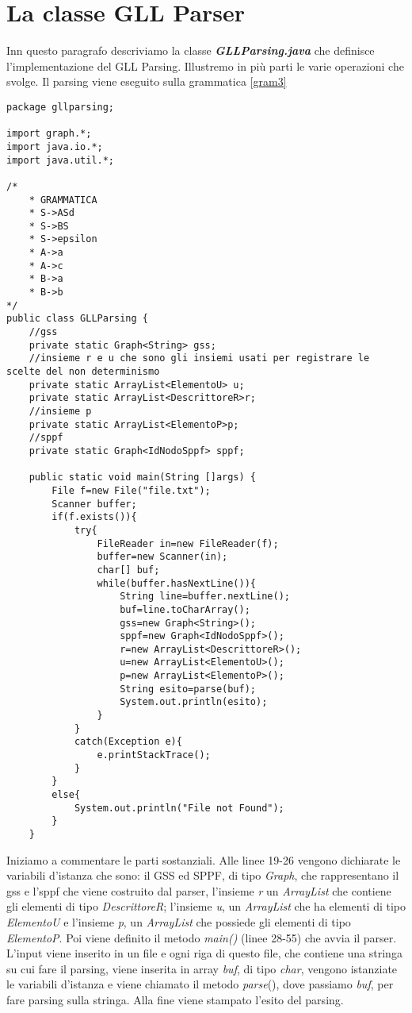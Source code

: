 \section{La classe GLL Parser}
Inn questo paragrafo descriviamo la classe \textbf{\textit{GLLParsing.java}} che definisce l'implementazione del GLL Parsing. Illustremo in più parti le varie operazioni che svolge. Il parsing viene eseguito sulla grammatica \ref{gram3} 
\begin{lstlisting}
package gllparsing;

import graph.*;
import java.io.*;
import java.util.*;
	
/*
	* GRAMMATICA
	* S->ASd
	* S->BS
	* S->epsilon
	* A->a
	* A->c
	* B->a
	* B->b
*/
public class GLLParsing {
	//gss
	private static Graph<String> gss;
	//insieme r e u che sono gli insiemi usati per registrare le scelte del non determinismo
	private static ArrayList<ElementoU> u;
	private static ArrayList<DescrittoreR>r;
	//insieme p
	private static ArrayList<ElementoP>p;
	//sppf
	private static Graph<IdNodoSppf> sppf;
	
	public static void main(String []args) {
		File f=new File("file.txt");
		Scanner buffer;
		if(f.exists()){
			try{
				FileReader in=new FileReader(f);
				buffer=new Scanner(in);
				char[] buf;
				while(buffer.hasNextLine()){
					String line=buffer.nextLine();
					buf=line.toCharArray();
					gss=new Graph<String>();
					sppf=new Graph<IdNodoSppf>();
					r=new ArrayList<DescrittoreR>();
					u=new ArrayList<ElementoU>();
					p=new ArrayList<ElementoP>();
					String esito=parse(buf);
					System.out.println(esito);
				}	
			}
			catch(Exception e){
				e.printStackTrace();
			}
		}
		else{
			System.out.println("File not Found");
		} 
	}	
\end{lstlisting}
Iniziamo a commentare le parti sostanziali. Alle linee 19-26 vengono dichiarate le variabili d'istanza che sono: il GSS ed SPPF, di tipo \textit{Graph}, che rappresentano il gss e l'sppf che viene costruito dal parser, l'insieme \textit{r} un \textit{ArrayList} che contiene gli elementi di tipo \textit{DescrittoreR}; l'insieme \textit{u}, un \textit{ArrayList} che ha elementi di tipo \textit{ElementoU} e l'insieme \textit{p}, un \textit{ArrayList} che possiede gli elementi di tipo \textit{ElementoP}. Poi viene definito il metodo \textit{main()} (linee 28-55) che avvia il parser. L'input viene inserito in un file e ogni riga di questo file, che contiene una stringa su cui fare il parsing, viene inserita in array \textit{buf}, di tipo \textit{char}, vengono istanziate le variabili d'istanza e viene chiamato il metodo \textit{parse}(), dove passiamo \textit{buf}, per fare parsing sulla stringa. Alla fine viene stampato l'esito del parsing.\\
